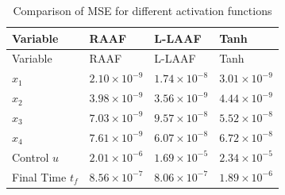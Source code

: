 \documentclass[
  number,
  preprint]{elsarticle}
\begin{document}
\begin{longtable}[]{@{}
  >{\raggedright\arraybackslash}p{}
  >{\raggedleft\arraybackslash}p{}
  >{\raggedleft\arraybackslash}p{}
  >{\raggedleft\arraybackslash}p{}@{}}
\caption{Comparison of MSE for different activation
functions}\label{tbl-ch3-mse-activation}\tabularnewline
\toprule\noalign{}
\begin{minipage}[b]{\linewidth}\raggedright
Variable
\end{minipage} & \begin{minipage}[b]{\linewidth}\raggedleft
RAAF
\end{minipage} & \begin{minipage}[b]{\linewidth}\raggedleft
L-LAAF
\end{minipage} & \begin{minipage}[b]{\linewidth}\raggedleft
Tanh
\end{minipage} \\
\midrule\noalign{}
\endfirsthead
\toprule\noalign{}
\begin{minipage}[b]{\linewidth}\raggedright
Variable
\end{minipage} & \begin{minipage}[b]{\linewidth}\raggedleft
RAAF
\end{minipage} & \begin{minipage}[b]{\linewidth}\raggedleft
L-LAAF
\end{minipage} & \begin{minipage}[b]{\linewidth}\raggedleft
Tanh
\end{minipage} \\
\midrule\noalign{}
\endhead
\bottomrule\noalign{}
\endlastfoot
\(x_1\) & \(2.10 \times 10^{-9}\) & \(1.74 \times 10^{-8}\) &
\(3.01 \times 10^{-9}\) \\
\(x_2\) & \(3.98 \times 10^{-9}\) & \(3.56 \times 10^{-9}\) &
\(4.44 \times 10^{-9}\) \\
\(x_3\) & \(7.03 \times 10^{-9}\) & \(9.57 \times 10^{-8}\) &
\(5.52 \times 10^{-8}\) \\
\(x_4\) & \(7.61 \times 10^{-9}\) & \(6.07 \times 10^{-8}\) &
\(6.72 \times 10^{-8}\) \\
Control \(u\) & \(2.01 \times 10^{-6}\) & \(1.69 \times 10^{-5}\) &
\(2.34 \times 10^{-5}\) \\
Final Time \(t_f\) & \(8.56 \times 10^{-7}\) & \(8.06 \times 10^{-7}\) &
\(1.89 \times 10^{-6}\) \\
\end{longtable}
\end{document}
